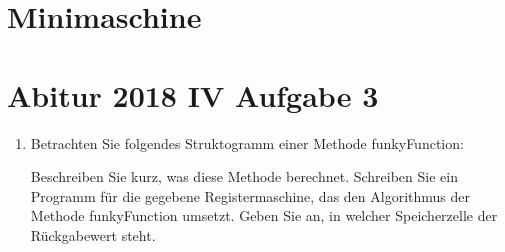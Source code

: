 \documentclass{lehramt-informatik-aufgabe}
\begin{document}
\section{Minimaschine}


\section{Abitur 2018 IV Aufgabe 3}

\begin{enumerate}

%

\item Betrachten Sie folgendes Struktogramm einer Methode funkyFunction:

Beschreiben Sie kurz, was diese Methode berechnet.
Schreiben Sie ein Programm für die gegebene Registermaschine, das den
Algorithmus der Methode funkyFunction umsetzt. Geben Sie an, in welcher
Speicherzelle der Rückgabewert steht.

\begin{multicols}{2}


\liSpaltenUmbruch
{}

\end{multicols}
\end{enumerate}
\end{document}
